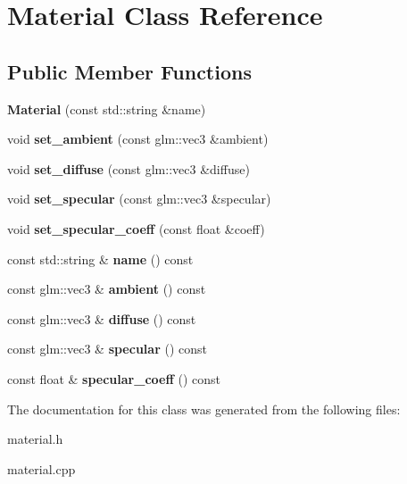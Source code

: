 \hypertarget{classMaterial}{\section{Material Class Reference}
\label{classMaterial}
}
\subsection*{Public Member Functions}
\begin{DoxyCompactItemize}
\item 
\hypertarget{classMaterial_aa4a0939b5a0f5d4c0ef4c7add40487e5}{{\bfseries Material} (const std\-::string \&name)}\label{classMaterial_aa4a0939b5a0f5d4c0ef4c7add40487e5}

\item 
\hypertarget{classMaterial_a31a589ebc9b7e94ef1bf37113b1b86fb}{void {\bfseries set\-\_\-ambient} (const glm\-::vec3 \&ambient)}\label{classMaterial_a31a589ebc9b7e94ef1bf37113b1b86fb}

\item 
\hypertarget{classMaterial_ab16e50a70020cb9a23de8aae333185ea}{void {\bfseries set\-\_\-diffuse} (const glm\-::vec3 \&diffuse)}\label{classMaterial_ab16e50a70020cb9a23de8aae333185ea}

\item 
\hypertarget{classMaterial_aac069e36183429342892d76e43392f89}{void {\bfseries set\-\_\-specular} (const glm\-::vec3 \&specular)}\label{classMaterial_aac069e36183429342892d76e43392f89}

\item 
\hypertarget{classMaterial_a75dbcebb1c5c337bb1511b62e0a775ff}{void {\bfseries set\-\_\-specular\-\_\-coeff} (const float \&coeff)}\label{classMaterial_a75dbcebb1c5c337bb1511b62e0a775ff}

\item 
\hypertarget{classMaterial_aaf3a23092b1fbfd4346a71fb091b48be}{const std\-::string \& {\bfseries name} () const }\label{classMaterial_aaf3a23092b1fbfd4346a71fb091b48be}

\item 
\hypertarget{classMaterial_a41c97ec67d40e331b1b9c9073a83291a}{const glm\-::vec3 \& {\bfseries ambient} () const }\label{classMaterial_a41c97ec67d40e331b1b9c9073a83291a}

\item 
\hypertarget{classMaterial_a20d17721220c394d517fba384376b28b}{const glm\-::vec3 \& {\bfseries diffuse} () const }\label{classMaterial_a20d17721220c394d517fba384376b28b}

\item 
\hypertarget{classMaterial_abf83bcfb75295d0b666766b2b3e0150f}{const glm\-::vec3 \& {\bfseries specular} () const }\label{classMaterial_abf83bcfb75295d0b666766b2b3e0150f}

\item 
\hypertarget{classMaterial_a213808b194302aafa5615ae2b8af435d}{const float \& {\bfseries specular\-\_\-coeff} () const }\label{classMaterial_a213808b194302aafa5615ae2b8af435d}

\end{DoxyCompactItemize}


The documentation for this class was generated from the following files\-:\begin{DoxyCompactItemize}
\item 
material.\-h\item 
material.\-cpp\end{DoxyCompactItemize}
